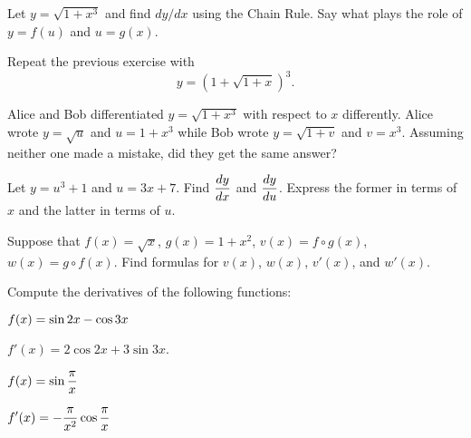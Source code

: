 \begin{multicols}{2}\setlength{\parindent}{0pt}
\problem  Let $y=\sqrt{1+x^3}$ and find $dy/dx$ using the 
Chain Rule.  Say what plays the role of $y=f(u)$ and $u=g(x)$.








\problem  Repeat the previous exercise with 
\[
y=(1+\sqrt{1+x})^3.
\]








\problem  Alice and Bob differentiated $y=\sqrt{1+x^3}$ with 
respect to $x$ differently.  Alice wrote $y=\sqrt{u}$ and $u=1+x^3$
while Bob wrote $y=\sqrt{1+v}$ and $v=x^3$.  Assuming neither one
made a mistake, did they get the same answer?








\problem  Let $y=u^3+1$ and $u=3x+7$.  Find $\displaystyle 
\frac{dy}{dx}$ and $\displaystyle \frac{dy}{du}$.  Express the former in
terms of $x$ and the latter in terms of $u$.








\problem  Suppose that $f(x)=\sqrt{x}$, $g(x)=1+x^2$, 
$v(x)=f\circ g(x)$, $w(x)=g\circ f(x)$. Find formulas for
$v(x)$, $w(x)$, $v'(x)$, and $w'(x)$.








\medskip
















\problem Compute the derivatives of the following functions: 




\subprob $\displaystyle f(x)   = \sin 2x-\cos 3x $




\answer 
$f'(x) = 2\cos 2x+3\sin 3x$.
\endanswer




\subprob $\displaystyle f(x)   = \sin\frac\pi x $




\answer 
$\displaystyle f'(x) = -\frac\pi{x^2}\cos\frac\pi x$
\endanswer





\end{multicols}

